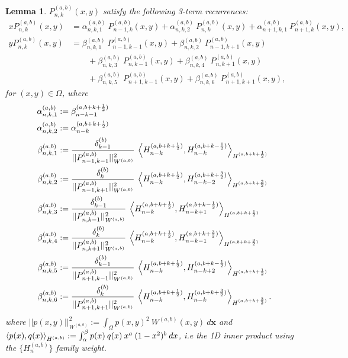 \documentclass[11pt, oneside]{article}   	%
\newcommand{\half}{\frac{1}{2}}
\newcommand{\Pnk}{P_{n,k}}
\newcommand{\Wab}{{W^{(a,b)}}}
\newcommand{\alphaab}{\alpha^{(a,b)}}
\newcommand{\betaab}{\beta^{(a,b)}}
\newtheorem{lemma}{Lemma}
\begin{document}
\begin{lemma}
$\Pnk^{(a,b)}(x,y)$ satisfy the following 3-term recurrences:
\begin{align}
x \Pnk^{(a,b)}(x,y) &= \alphaab_{n,k,1} \: P_{n-1, k}^{(a,b)}(x, y) + \alphaab_{n,k,2} \: P_{n, k}^{(a,b)}(x, y) + \alphaab_{n+1,k,1} \: P_{n+1, k}^{(a,b)}(x, y), \\
y \Pnk^{(a,b)}(x,y) &= \betaab_{n,k,1} \: P_{n-1, k-1}^{(a,b)}(x, y) + \betaab_{n,k,2} \: P_{n-1, k+1}^{(a,b)}(x, y) \nonumber \\
		& \quad \quad + \betaab_{n,k,3} \: P_{n, k-1}^{(a,b)}(x, y) + \betaab_{n,k,4} \: P_{n, k+1}^{(a,b)}(x, y) \nonumber \\
		& \quad \quad + \betaab_{n,k,5} \: P_{n+1, k-1}^{(a,b)}(x, y) + \betaab_{n,k,6} \: P_{n+1, k+1}^{(a,b)}(x, y),
\end{align}
for \((x,y) \in \Omega\), where
\begin{align}
\alphaab_{n,k,1} &:= \beta_{n-k-1}^{(a, b+k+\half)} \\
\alphaab_{n,k,2} &:= \alpha_{n-k}^{(a, b+k+\half)} \\
\betaab_{n,k,1} &:= \frac{\delta_{k-1}^{(b)}}{|| P_{n-1,k-1}^{(a,b)} ||_{W^{(a,b)}}^2} \: \ip<H_{n-k}^{(a, b+k+\half)}, H_{n-k}^{(a, b+k-\half)}>_{H^{(a, b+k+\half)}} \\
\betaab_{n,k,2} &:= \frac{\delta_{k}^{(b)}}{|| P_{n-1,k+1}^{(a,b)} ||_{W^{(a,b)}}^2} \: \ip<H_{n-k}^{(a, b+k+\half)}, H_{n-k-2}^{(a, b+k+\frac{3}{2})}>_{H^{(a, b+k+\frac{3}{2})}} \\
\betaab_{n,k,3} &:= \frac{\delta_{k-1}^{(b)}}{|| P_{n,k-1}^{(a,b)} ||_{W^{(a,b)}}^2} \: \ip<H_{n-k}^{(a, b+k+\half)}, H_{n-k+1}^{(a, b+k-\half)}>_{H^{(a, b+k+\half)}} \\
\betaab_{n,k,4} &:= \frac{\delta_{k}^{(b)}}{|| P_{n,k+1}^{(a,b)} ||_{W^{(a,b)}}^2} \: \ip<H_{n-k}^{(a, b+k+\half)}, H_{n-k-1}^{(a, b+k+\frac{3}{2})}>_{H^{(a, b+k+\frac{3}{2})}} \\
\betaab_{n,k,5} &:= \frac{\delta_{k-1}^{(b)}}{|| P_{n+1,k-1}^{(a,b)} ||_{W^{(a,b)}}^2} \: \ip<H_{n-k}^{(a, b+k+\half)}, H_{n-k+2}^{(a, b+k-\half)}>_{H^{(a, b+k+\half)}} \\
\betaab_{n,k,6} &:= \frac{\delta_{k}^{(b)}}{|| P_{n+1,k+1}^{(a,b)} ||_{W^{(a,b)}}^2} \: \ip<H_{n-k}^{(a, b+k+\half)}, H_{n-k}^{(a, b+k+\frac{3}{2})}>_{H^{(a, b+k+\frac{3}{2})}}. 
\end{align}
where $|| p(x,y) ||_{W^{(a,b)}}^2 := \int_\Omega p(x,y)^2 \: \Wab(x,y) \: d\mathbf{x}$ and $\ip<p(x), q(x)>_{H^{(a, b)}} := \int_\alpha^\beta p(x) \: q(x) \: x^a \: (1-x^2)^b \: dx$, i.e the 1D inner product using the $\{H^{(a,b)}_n\}$ family weight.

\end{lemma}
\end{document}
